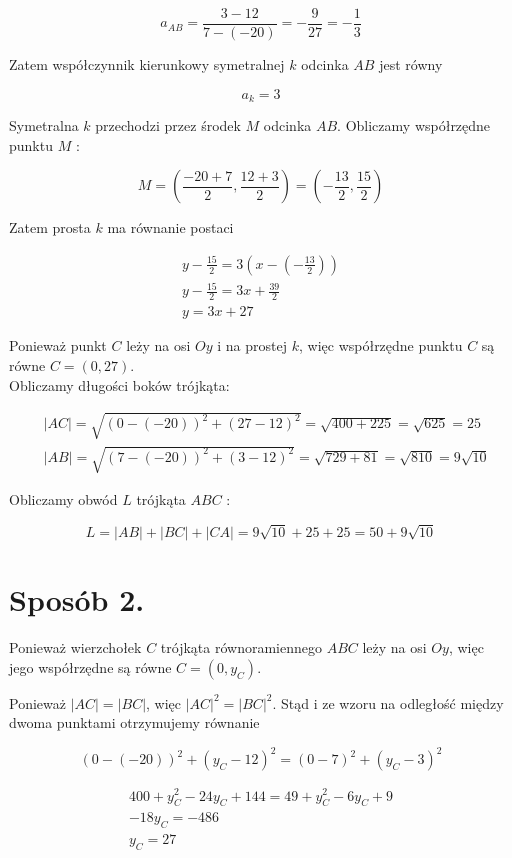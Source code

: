 \documentclass[10pt]{article}
\begin{document}
$$
a_{A B}=\frac{3-12}{7-(-20)}=-\frac{9}{27}=-\frac{1}{3}
$$

Zatem współczynnik kierunkowy symetralnej $k$ odcinka $A B$ jest równy

$$
a_{k}=3
$$

Symetralna $k$ przechodzi przez środek $M$ odcinka $A B$. Obliczamy współrzędne punktu $M$ :

$$
M=\left(\frac{-20+7}{2}, \frac{12+3}{2}\right)=\left(-\frac{13}{2}, \frac{15}{2}\right)
$$

Zatem prosta $k$ ma równanie postaci

$$
\begin{gathered}
y-\frac{15}{2}=3\left(x-\left(-\frac{13}{2}\right)\right) \\
y-\frac{15}{2}=3 x+\frac{39}{2} \\
y=3 x+27
\end{gathered}
$$

Ponieważ punkt $C$ leży na osi $O y$ i na prostej $k$, więc współrzędne punktu $C$ są równe $C=(0,27)$.\\
Obliczamy długości boków trójkąta:

$$
\begin{aligned}
& |A C|=\sqrt{(0-(-20))^{2}+(27-12)^{2}}=\sqrt{400+225}=\sqrt{625}=25 \\
& |A B|=\sqrt{(7-(-20))^{2}+(3-12)^{2}}=\sqrt{729+81}=\sqrt{810}=9 \sqrt{10}
\end{aligned}
$$

Obliczamy obwód $L$ trójkąta $A B C$ :

$$
L=|A B|+|B C|+|C A|=9 \sqrt{10}+25+25=50+9 \sqrt{10}
$$

\section*{Sposób 2.}
Ponieważ wierzchołek $C$ trójkąta równoramiennego $A B C$ leży na osi $O y$, więc jego współrzędne są równe $C=\left(0, y_{C}\right)$.

Ponieważ $|A C|=|B C|$, więc $|A C|^{2}=|B C|^{2}$. Stąd i ze wzoru na odległość między dwoma punktami otrzymujemy równanie

$$
(0-(-20))^{2}+\left(y_{C}-12\right)^{2}=(0-7)^{2}+\left(y_{C}-3\right)^{2}
$$

$$
\begin{gathered}
400+y_{C}^{2}-24 y_{C}+144=49+y_{C}^{2}-6 y_{C}+9 \\
-18 y_{C}=-486 \\
y_{C}=27
\end{gathered}
$$
\end{document}
